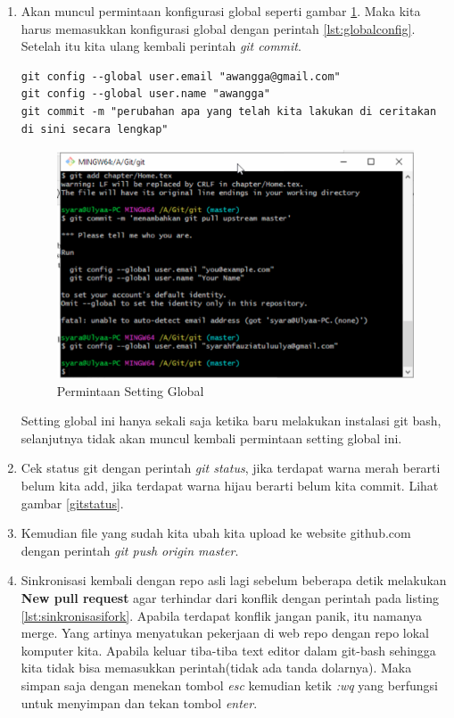 \begin{enumerate}
\item Akan muncul permintaan konfigurasi global seperti gambar \ref{configglobal}. Maka kita harus memasukkan konfigurasi global dengan perintah \ref{lst:globalconfig}. Setelah itu kita ulang kembali perintah \textit{git commit}.
\begin{lstlisting}[caption=Perintah Sinkronisasi dengan repo asal,label={lst:globalconfig}]
git config --global user.email "awangga@gmail.com"
git config --global user.name "awangga"
git commit -m "perubahan apa yang telah kita lakukan di ceritakan di sini secara lengkap"
\end{lstlisting}
\begin{figure}[!htbp]
\centerline{\includegraphics[width=.75\textwidth]{Figures/configglobal}}
\caption{Permintaan Setting Global}
\label{configglobal}
\end{figure}
Setting global ini hanya sekali saja ketika baru melakukan instalasi git bash, selanjutnya tidak akan muncul kembali permintaan setting global ini.

\item Cek status git dengan perintah \textit{git status}, jika terdapat warna merah berarti belum kita add, jika terdapat warna hijau berarti belum kita commit. Lihat gambar \ref{gitstatus}.
\item Kemudian file yang sudah kita ubah kita upload ke website github.com dengan perintah \textit{git push origin master}.
\item Sinkronisasi kembali dengan repo asli lagi sebelum beberapa detik melakukan \textbf{New pull request} agar terhindar dari konflik dengan perintah pada listing \ref{lst:sinkronisasifork}.
Apabila terdapat konflik jangan panik, itu namanya merge. Yang artinya menyatukan pekerjaan di web repo dengan repo lokal komputer kita. Apabila keluar tiba-tiba text editor dalam git-bash sehingga kita tidak bisa memasukkan perintah(tidak ada tanda dolarnya). Maka simpan saja dengan menekan tombol \textit{esc} kemudian ketik \textit{:wq} yang berfungsi untuk menyimpan dan tekan tombol \textit{enter}.


\end{enumerate}

